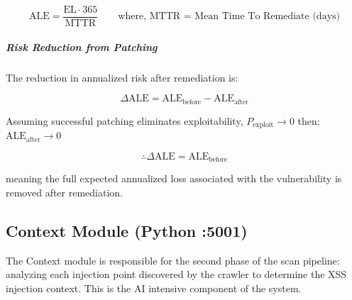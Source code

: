 \[
\mathrm{ALE}
=
\frac{
\mathrm{EL} \cdot 365
}{
\mathrm{MTTR}
}
\qquad
\text{
where, 
 $\mathrm{MTTR}$ = Mean Time To Remediate (days)}
 \]

\subparagraph*{Risk Reduction from Patching}

The reduction in annualized risk after remediation is:

\[
\Delta \mathrm{ALE}
=
\mathrm{ALE}_{\mathrm{before}}
-
\mathrm{ALE}_{\mathrm{after}}
\]

Assuming successful patching eliminates exploitability,  $ P_{\mathrm{exploit}} \to 0 $ then: $\mathrm{ALE}_{\mathrm{after}} \to 0$ 
 
\[ \therefore \Delta \mathrm{ALE} = \mathrm{ALE}_{\mathrm{before}}\]

meaning the full expected annualized loss associated with the vulnerability is removed after remediation.
\subsection{ Context Module (Python :5001)}

The Context module is responsible for the second phase of the scan pipeline: analyzing each injection point discovered by the crawler to determine the XSS injection context. This is the AI intensive component of the system.
